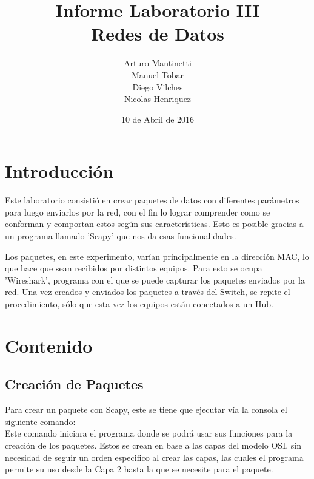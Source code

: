 \documentclass[spanish]{udpreport}
\title{Informe Laboratorio III \\ Redes de Datos}
\author{Arturo Mantinetti \\ Manuel Tobar \\ Diego Vilches \\ Nicolas Henriquez}
\date{10 de Abril de 2016} %
\begin{document}
\maketitle

\tableofcontents

\chapter{Introducción}

Este laboratorio consistió en crear paquetes de datos con diferentes parámetros para luego enviarlos por la red, con el fin lo lograr comprender como se conforman y comportan estos según sus características. Esto es posible gracias a un programa llamado 'Scapy' que nos da esas funcionalidades. 

Los paquetes, en este experimento, varían principalmente en la dirección MAC, lo que hace que sean recibidos por distintos equipos. Para esto se ocupa 'Wireshark', programa con el que se puede capturar los paquetes enviados por la red.  Una vez creados y enviados los paquetes a través del Switch, se repite el procedimiento, sólo que esta vez los equipos están conectados a un Hub. 



\chapter{Contenido}

\section{Creación de Paquetes}
Para crear un paquete con Scapy, este se tiene que ejecutar vía la consola el siguiente comando:
\\


Este comando iniciara el programa donde se podrá usar sus funciones para la creación de los paquetes. Estos se crean en base a las capas del modelo OSI, sin necesidad de seguir un orden especifico al crear las capas, las cuales el programa permite su uso desde la Capa 2 hasta la que se necesite para el paquete.
\end{document}
